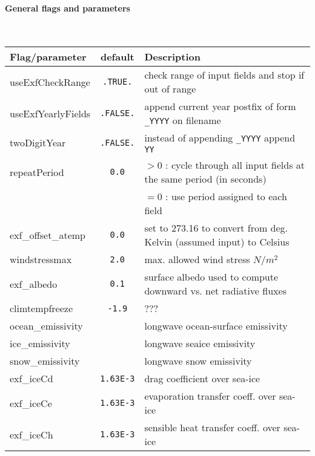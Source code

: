 \paragraph{General flags and parameters}
~ \\
%
\begin{table}[h!]
\centering
  \label{tab:pkg:exf:runtime_flags}
  {\footnotesize
    \begin{tabular}{|l|c|l|}
      \hline 
      \textbf{Flag/parameter} & \textbf{default} &  \textbf{Description}  \\
      \hline \hline
        useExfCheckRange & \texttt{.TRUE.} & 
           check range of input fields and stop if out of range \\
        useExfYearlyFields & \texttt{.FALSE.} & 
           append current year postfix of form \texttt{\_YYYY} on filename \\
        twoDigitYear & \texttt{.FALSE.} & 
           instead of appending \texttt{\_YYYY} append  \texttt{YY} \\
        repeatPeriod & \texttt{0.0} & $ > 0 $ : 
           cycle through all input fields at the same period (in seconds) \\
        ~            & ~            & $ = 0 $ :
           use period assigned to each field \\
        exf\_offset\_atemp & \texttt{0.0} & set to 273.16 to convert from deg. Kelvin (assumed input) to Celsius \\
        windstressmax & \texttt{2.0} & 
           max. allowed wind stress $N/m^2$ \\
        exf\_albedo & \texttt{0.1} & 
          surface albedo used to compute downward vs. net radiative fluxes \\
        climtempfreeze & \texttt{-1.9} & 
          ??? \\
        ocean\_emissivity & \texttt{} & 
          longwave ocean-surface emissivity \\
        ice\_emissivity & \texttt{} & 
          longwave seaice emissivity \\
        snow\_emissivity & \texttt{} & 
          longwave  snow  emissivity \\
        exf\_iceCd & \texttt{1.63E-3} & 
          drag coefficient over sea-ice \\
        exf\_iceCe & \texttt{1.63E-3} & 
          evaporation transfer coeff. over sea-ice \\
        exf\_iceCh & \texttt{1.63E-3} & 
          sensible heat transfer coeff. over sea-ice \\

\end{tabular}}
\end{table}
